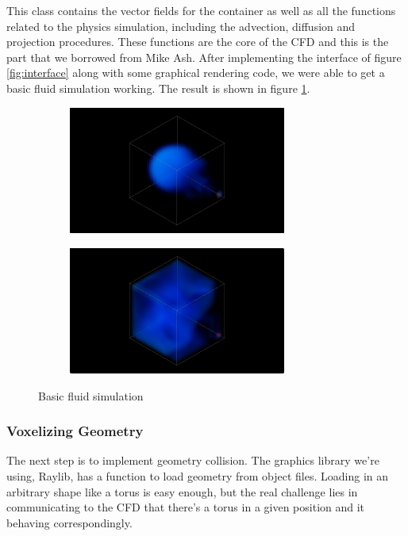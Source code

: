 \documentclass[a4paper,12pt,titlepage]{article}
\begin{document}
This class contains the vector fields for the container as well as all the
functions related to the physics simulation, including the advection, diffusion
and projection procedures. These functions are the core of the CFD and
this is the part that we borrowed from Mike Ash. After implementing the
interface of figure \ref{fig:interface} along with some graphical
rendering code, we were able to get a basic fluid simulation working. The
result is shown in figure \ref{fig:core}.

\begin{figure}[H]
    \centering
    \begin{subfigure}[t]{0.45\textwidth}
        \centering
        \includegraphics[height=1.65in]{resources/core1.png}
    \end{subfigure}
    \hfill
    \begin{subfigure}[t]{0.45\textwidth}
        \centering
        \includegraphics[height=1.65in]{resources/core2.png}
    \end{subfigure}
	\caption{Basic fluid simulation}
	\label{fig:core}
\end{figure}

\subsubsection{Voxelizing Geometry}
The next step is to implement geometry collision. The graphics library we're using,
Raylib, has a function to load geometry from object files. Loading in an arbitrary shape
like a torus is easy enough, but the real challenge lies in communicating to the
CFD that there's a torus in a given position and it behaving correspondingly.
\end{document}
